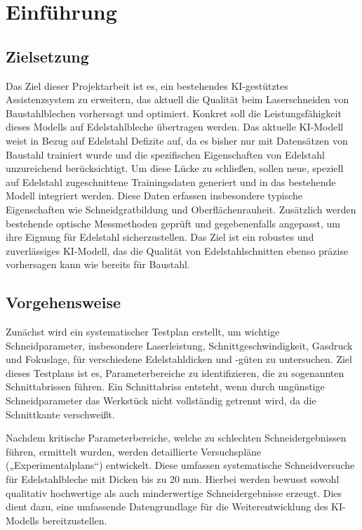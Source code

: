 \chapter{Einführung}
\section{Zielsetzung}
Das Ziel dieser Projektarbeit ist es, ein bestehendes KI-gestütztes Assistenzsystem zu erweitern, das aktuell die Qualität beim Laserschneiden von Baustahlblechen vorhersagt und optimiert. Konkret soll die Leistungsfähigkeit dieses Modells auf Edelstahlbleche übertragen werden. Das aktuelle KI-Modell weist in Bezug auf Edelstahl Defizite auf, da es bisher nur mit Datensätzen von Baustahl trainiert wurde und die spezifischen Eigenschaften von Edelstahl unzureichend berücksichtigt.
Um diese Lücke zu schließen, sollen neue, speziell auf Edelstahl zugeschnittene Trainingsdaten generiert und in das bestehende Modell integriert werden. Diese Daten erfassen insbesondere typische Eigenschaften wie Schneidgratbildung und Oberflächenrauheit. Zusätzlich werden bestehende optische Messmethoden geprüft und gegebenenfalls angepasst, um ihre Eignung für Edelstahl sicherzustellen. Das Ziel ist ein robustes und zuverlässiges KI-Modell, das die Qualität von Edelstahlschnitten ebenso präzise vorhersagen kann wie bereits für Baustahl.

\section{Vorgehensweise}
Zunächst wird ein systematischer Testplan erstellt, um wichtige Schneidparameter, insbesondere Laserleistung, Schnittgeschwindigkeit, Gasdruck und Fokuslage, für verschiedene Edelstahldicken und -güten zu untersuchen. Ziel dieses Testplans ist es, Parameterbereiche zu identifizieren, die zu sogenannten Schnittabrissen führen. Ein Schnittabriss entsteht, wenn durch ungünstige Schneidparameter das Werkstück nicht vollständig getrennt wird, da die Schnittkante verschweißt.

Nachdem kritische Parameterbereiche, welche zu schlechten Schneidergebnissen führen, ermittelt wurden, werden detaillierte Versuchspläne („Experimentalplans“) entwickelt. Diese umfassen systematische Schneidversuche für Edelstahlbleche mit Dicken bis zu 20 mm. Hierbei werden bewusst sowohl qualitativ hochwertige als auch minderwertige Schneidergebnisse erzeugt. Dies dient dazu, eine umfassende Datengrundlage für die Weiterentwicklung des KI-Modells bereitzustellen.

